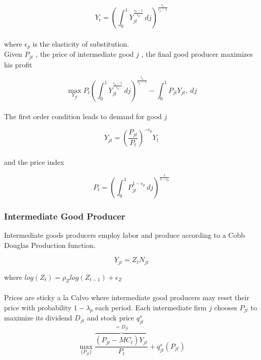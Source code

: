 \documentclass[titlepage]{\econtex}\providecommand{\texname}{FBS-NK}
\begin{document}
$$ Y_{t} = \left(\int_{0}^{1} Y_{jt}^{\frac{\epsilon_{p}-1}{\epsilon_{p}}}\, dj\right)^{\frac{\epsilon_{p}}{\epsilon_{p}-1}}$$ \\

where $\epsilon_{p}$ is the elasticity of substitution. \\ 

Given $P_{jt}$ , the price of intermediate good $j$ ,  the final good producer maximizes his profit

$$ \max_{Y_{jt}} P_{t} \left(\int_{0}^{1} Y_{jt}^{\frac{\epsilon_{p}-1}{\epsilon_{p}}}\, dj\right)^{\frac{\epsilon_{p}}{\epsilon_{p}-1}} - \int_{0}^{1} P_{jt} Y_{jt} ,\ dj $$ \\


The first order condition leads to demand for good $j$

\begin{equation} Y_{jt} = \left(\frac {P_{jt}}{P_{t}}\right)^{- \epsilon_{p}} Y_{t}\end{equation} \\

and the price index

\begin{equation} P_{t} = \left(\int_{0}^{1} P_{jt}^{1-\epsilon_{p}}\,dj \right )^{\frac{1}{1-\epsilon_{p}}} \end{equation}


\hypertarget{Intermediate Good Producer}{}
\subsubsection{Intermediate Good Producer}

Intermediate goods producers  employ labor and produce according to a Cobb Douglas Production function.  

$$Y_{jt} =  Z_{t}  N_{jt}$$ 

where $log(Z_{t}) = \rho_{Z} log( Z_{t-1}) + \epsilon_{Z}$ \\ \\


Prices are sticky a la Calvo where intermediate good producers may reset their price with probability $ 1 -\lambda_{p}$ each period. Each intermediate firm $j$ chooses $P_{jt}$ to maximize its dividend $D_{jt}$ and stock price $q^{s}_{jt} $ \\ 
 
 $$\max_{\{P_{jt}\}} \overbrace{\frac{(P_{jt} - MC_{t})Y_{jt}}{P_{t}}}^{=D_{jt}} + q^{s}_{jt}\left(P_{jt}\right) $$ \\
 
\end{document}

